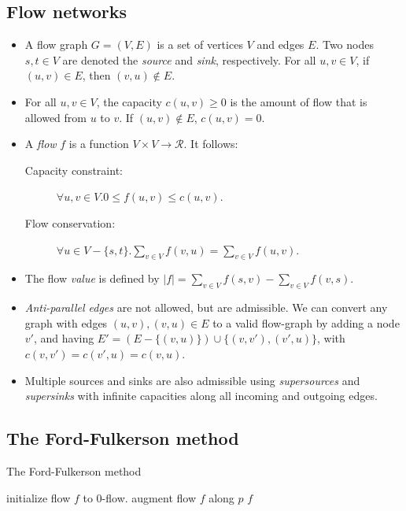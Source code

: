\subsection{Flow networks}
\begin{itemize}
\item A flow graph $G=(V,E)$ is a set of vertices $V$ and edges
  $E$. Two nodes $s,t \in V$ are denoted the \emph{source} and
  \emph{sink}, respectively. For all $u,v \in V$, if $(u,v) \in E$,
  then $(v,u)\not\in E$.

\item For all $u,v \in V$, the capacity $c(u,v) \geq 0$ is the amount
  of flow that is allowed from $u$ to $v$. If $(u,v) \not\in E$,
  $c(u,v) = 0$.

\item A \emph{flow} $f$ is a function $V \times V \rightarrow
  \mathcal{R}$. It follows:
  \begin{description}
  \item[Capacity constraint:] $\forall u,v \in V. 0 \leq f(u,v) \leq c(u,v)$.
  \item[Flow conservation:] $\forall u \in V - \{s,t\}. \sum_{v\in V}
    f(v,u) = \sum_{v\in V} f(u,v)$.
  \end{description}

\item The flow \emph{value} is defined by $|f| = \sum_{v\in V} f(s,v)
  - \sum_{v\in V} f(v,s)$.

\item \emph{Anti-parallel edges} are not allowed, but are
  admissible. We can convert any graph with edges $(u,v), (v,u) \in E$
  to a valid flow-graph by adding a node $v'$, and having $E' = (E -
  \{(v,u)\}) \cup \{ (v,v'), (v', u) \}$, with $c(v,v') = c(v',u) =
  c(v,u)$.

\item Multiple sources and sinks are also admissible using
  \emph{supersources} and \emph{supersinks} with infinite capacities
  along all incoming and outgoing edges.
\end{itemize}

\subsection{The Ford-Fulkerson method}

\begin{algorithm}
\caption{The Ford-Fulkerson method}
\begin{algorithmic}[1]
  \State initialize flow $f$ to $0$-flow.
    \State augment flow $f$ along $p$
  \EndWhile
  \State \Return $f$
\EndProcedure
\end{algorithmic}
\end{algorithm}

